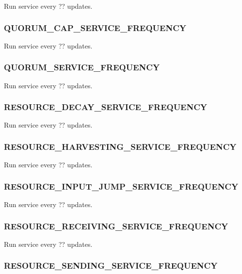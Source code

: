 
Run service every ?? updates.

\subsubsection{QUORUM\_CAP\_SERVICE\_FREQUENCY}


Run service every ?? updates.

\subsubsection{QUORUM\_SERVICE\_FREQUENCY}


Run service every ?? updates.

\subsubsection{RESOURCE\_DECAY\_SERVICE\_FREQUENCY}


Run service every ?? updates.

\subsubsection{RESOURCE\_HARVESTING\_SERVICE\_FREQUENCY}


Run service every ?? updates.

\subsubsection{RESOURCE\_INPUT\_JUMP\_SERVICE\_FREQUENCY}


Run service every ?? updates.

\subsubsection{RESOURCE\_RECEIVING\_SERVICE\_FREQUENCY}


Run service every ?? updates.

\subsubsection{RESOURCE\_SENDING\_SERVICE\_FREQUENCY}

